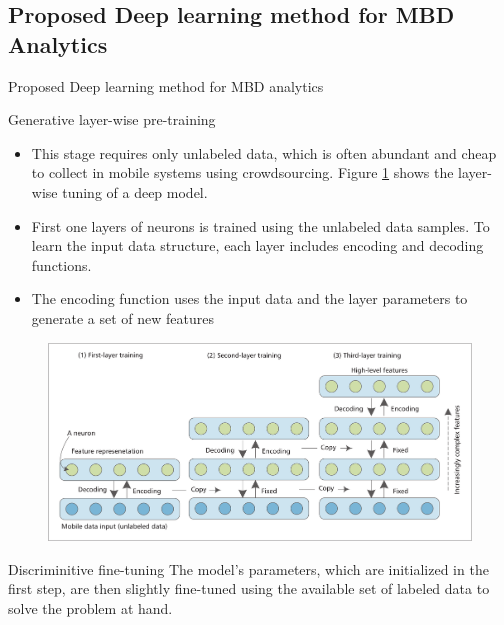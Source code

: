 \documentclass[newPxFont]{beamer}
\begin{document}
\subsection{Proposed Deep learning method for MBD Analytics}
\begin{frame}[c, allowframebreaks]{Proposed Deep learning method for MBD analytics}
	\begin{block}{Generative layer-wise pre-training}
    
      \begin{itemize}
			\item{This stage requires only
unlabeled data, which is often abundant and cheap to collect
in mobile systems using crowdsourcing. Figure \ref{fig:training} shows the
layer-wise tuning of a deep model.}

			\item{First one layers of neurons is trained using the unlabeled data samples. To learn the input data structure, each layer includes encoding and decoding functions.}
            
            \vspace{1em}
            
            \item{The encoding function uses the input data and the layer parameters to generate a set of new features}
            
            
      \end{itemize}
    \end{block}
    
    \vspace{5em}
    
    \begin{figure}
		\centering
		\includegraphics[width=1\linewidth]{resources/deep_learning.png}
        \label{fig:training}
	\end{figure}
    
    \vspace{2em}
    
    \begin{block}{Discriminitive fine-tuning}
    	The model’s parameters, which
are initialized in the first step, are then slightly fine-tuned
using the available set of labeled data to solve the problem at
hand.
    \end{block}

\end{frame}
\end{document}
